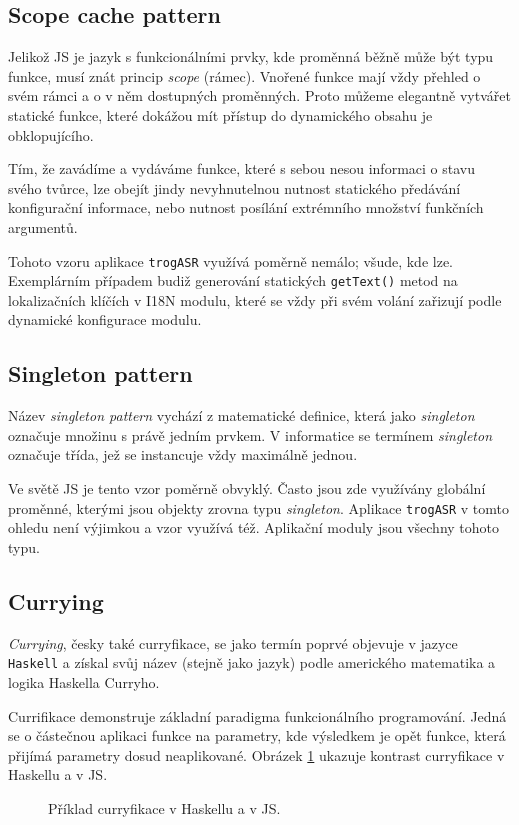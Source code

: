 \subsection{Scope cache pattern}

Jelikož JS je jazyk s funkcionálními prvky, kde proměnná běžně může být typu funkce, musí znát princip {\sl scope} (rámec). Vnořené funkce mají vždy přehled o svém rámci a o v něm dostupných proměnných. Proto můžeme elegantně vytvářet statické funkce, které dokážou mít přístup do dynamického obsahu je obklopujícího.

Tím, že zavádíme a vydáváme funkce, které s sebou nesou informaci o stavu svého tvůrce, lze obejít jindy nevyhnutelnou nutnost statického předávání konfigurační informace, nebo nutnost posílání extrémního množství funkčních argumentů.

Tohoto vzoru aplikace \verb|trogASR| využívá poměrně nemálo; všude, kde lze. Exemplárním případem budiž generování statických \verb|getText()| metod na lokalizačních klíčích v I18N modulu, které se vždy při svém volání zařizují podle dynamické konfigurace modulu.

\subsection{Singleton pattern}

Název {\sl singleton pattern} vychází z matematické definice, která jako {\sl singleton} označuje množinu s právě jedním prvkem. V informatice se termínem {\sl singleton} označuje třída, jež se instancuje vždy maximálně jednou.

Ve světě JS je tento vzor poměrně obvyklý. Často jsou zde využívány globální proměnné, kterými jsou objekty zrovna typu {\sl singleton}. Aplikace \verb|trogASR| v tomto ohledu není výjimkou a vzor využívá též. Aplikační moduly jsou všechny tohoto typu.

\subsection{Currying}

{\sl Currying}, česky také curryfikace, se jako termín poprvé objevuje v jazyce \verb|Haskell| a získal svůj název (stejně jako jazyk) podle amerického matematika a logika Haskella Curryho.

Currifikace demonstruje základní paradigma funkcionálního programování. Jedná se o částečnou aplikaci funkce na parametry, kde výsledkem je opět funkce, která přijímá parametry dosud neaplikované. Obrázek \ref{fig:curry} ukazuje kontrast curryfikace v Haskellu a v JS.
\\
\begin{figure}[h]
	
	\caption{Příklad curryfikace v Haskellu a v JS.}
	\label{fig:curry}
\end{figure}

